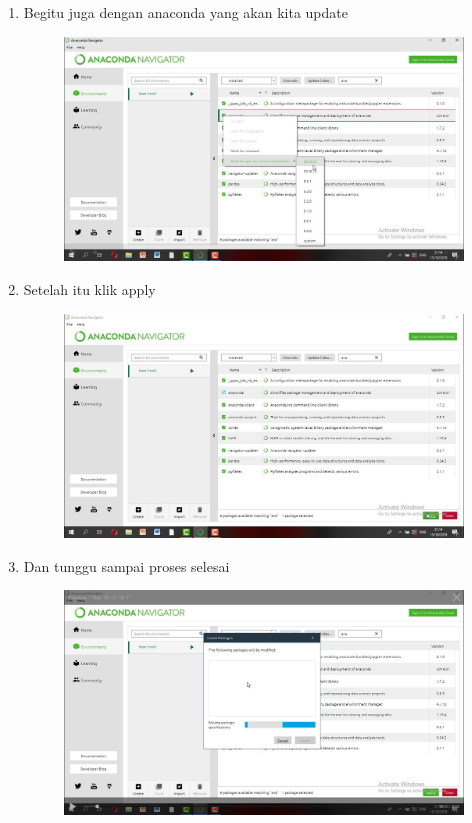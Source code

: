 \begin{enumerate}
\begin{enumerate}
\begin{enumerate}
\begin{figure}[h]
    \caption{}
    \label{fig:my_label}
\end{figure}
\item Begitu juga dengan anaconda yang akan kita update
\begin{figure}[h]
    \centering
    \includegraphics[scale=0.2]{gambar/20.png}
    \caption{}
    \label{fig:my_label}
\end{figure}
\item Setelah itu klik apply
\begin{figure}[h]
    \centering
    \includegraphics[scale=0.2]{gambar/21.png}
    \caption{}
    \label{fig:my_label}
\end{figure}
\item Dan tunggu sampai proses selesai
\begin{figure}[h]
    \centering
    \includegraphics[scale=0.2]{gambar/22.png}

\end{figure}
\end{enumerate}
\end{enumerate}
\end{enumerate}
